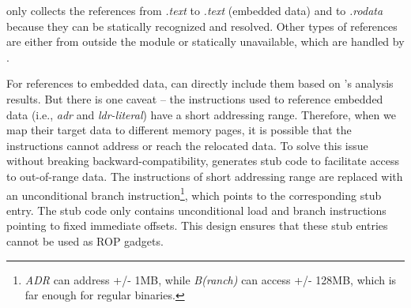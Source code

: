 


\NPatcher only collects the references from \textit{.text} to \textit{.text} (embedded data) and to \textit{.rodata} because they can be statically recognized and resolved. Other types of references are either from outside the module or statically unavailable, which are handled by \NLoader.


For references to embedded data, \NPatcher can directly include them based on \NDisassembler's analysis results.
But there is one caveat -- the instructions used to reference embedded data (i.e., \textit{adr} and \textit{ldr-literal}) have a short addressing range. Therefore, when we map their target data to different memory pages, it is possible that the instructions cannot address or reach 
the relocated data. To solve this issue without breaking backward-compatibility, 
\NPatcher generates stub code to facilitate access to out-of-range data. The instructions of short addressing range are replaced with an unconditional branch instruction\footnote{\textit{ADR} can address +/- 1MB, while \textit{B(ranch)} can access +/- 128MB, which is far enough for regular binaries.}, which points to the corresponding stub entry. The stub code only contains unconditional load and branch instructions pointing to fixed immediate offsets. 
This design ensures that these stub entries cannot be used as ROP gadgets. 

